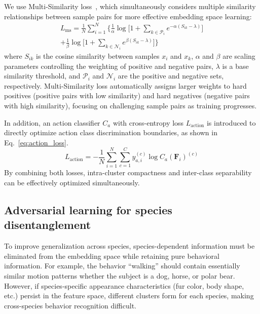 \documentclass[twocolumn]{svjour3}
\begin{document}
We use Multi-Similarity loss~\cite{wang2019multi}, which simultaneously considers multiple similarity relationships between sample pairs for more effective embedding space learning:
\begin{multline}
  L_{\mathrm{ms}} = \frac{1}{N} \sum_{i=1}^{N} \biggl\{
    \frac{1}{\alpha} \log \biggl[ 1 + \sum_{k \in \mathcal{P}_i} e^{-\alpha (S_{ik} - \lambda)} \biggr] \\
    + \frac{1}{\beta} \log \biggl[ 1 + \sum_{k \in \mathcal{N}_i} e^{\beta (S_{ik} - \lambda)} \biggr]
  \biggr\}
  \label{eq:ms_loss}
\end{multline}
where $S_{ik}$ is the cosine similarity between samples $x_i$ and $x_k$, $\alpha$ and $\beta$ are scaling parameters controlling the weighting of positive and negative pairs, $\lambda$ is a base similarity threshold, and $\mathcal{P}_i$ and $\mathcal{N}_i$ are the positive and negative sets, respectively.
Multi-Similarity loss automatically assigns larger weights to hard positives (positive pairs with low similarity) and hard negatives (negative pairs with high similarity), focusing on challenging sample pairs as training progresses.

In addition, an action classifier $C_a$ with cross-entropy loss $L_{\mathrm{action}}$ is introduced to directly optimize action class discrimination boundaries, as shown in Eq.~\eqref{eq:action_loss}.
\begin{equation}
  L_{\mathrm{action}} = -\frac{1}{N} \sum_{i=1}^{N} \sum_{c=1}^{C} y_{a,i}^{(c)} \log C_a(\mathbf{F}_i)^{(c)}
  \label{eq:action_loss}
\end{equation}
By combining both losses, intra-cluster compactness and inter-class separability can be effectively optimized simultaneously.

\subsection{Adversarial learning for species disentanglement}

To improve generalization across species, species-dependent information must be eliminated from the embedding space while retaining pure behavioral information.
For example, the behavior ``walking'' should contain essentially similar motion patterns whether the subject is a dog, horse, or polar bear.
However, if species-specific appearance characteristics (fur color, body shape, etc.) persist in the feature space, different clusters form for each species, making cross-species behavior recognition difficult.
\end{document}
